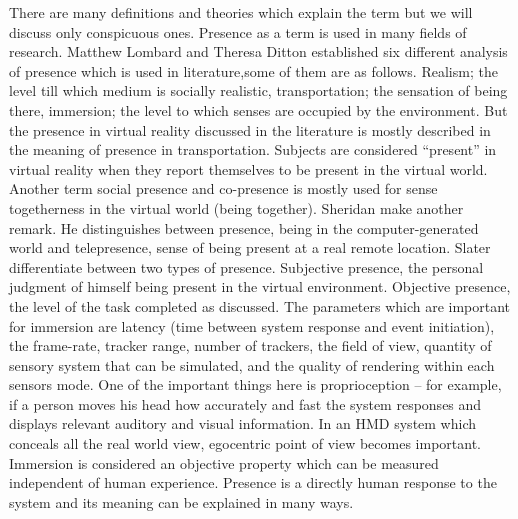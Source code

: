 There are many definitions and theories which explain the term but we will discuss only conspicuous ones. Presence as a term is used in many fields of research. Matthew Lombard and Theresa Ditton established six different analysis of presence which is used in literature,some of them are as follows. Realism; the level till which medium is socially realistic, transportation; the sensation of being there, immersion; the level to which senses are occupied by the environment. But the presence in virtual reality discussed in the literature is mostly described in the meaning of presence in transportation. Subjects are considered “present” in virtual reality when they report themselves to be present in the virtual world. Another term social presence and co-presence is mostly used for sense togetherness in the virtual world (being together).\cite{lombard1997heart} Sheridan make another remark. He distinguishes between presence, being in the computer-generated world and telepresence, sense of being present at a real remote location\cite{sheridan1992musings}. Slater differentiate between two types of presence. Subjective presence, the personal judgment of himself being present in the virtual environment. Objective presence, the level of the task completed as discussed.\cite{slater1998influence}
The parameters which are important for immersion are latency (time between system response and event initiation), the frame-rate, tracker range, number of trackers, the field of view, quantity of sensory system that can be simulated, and the quality of rendering within each sensors mode. One of the important things here is proprioception – for example, if a person moves his head how accurately and fast the system responses and displays relevant auditory and visual information\cite{sanchez2005presence}. In an HMD system which conceals all the real world view, egocentric point of view becomes important. Immersion is considered an objective property which can be measured independent of human experience. Presence is a directly human response to the system and its meaning can be explained in many ways.



